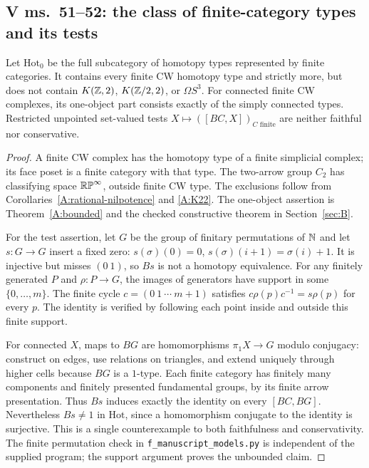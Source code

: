 \subsection{V ms.~51--52: the class of finite-category types and its tests}
\begin{proposition}\label{F:Hot0}
Let $\mathrm{Hot}_0$ be the full subcategory of homotopy types represented
by finite categories. It contains every finite CW homotopy type and
strictly more, but does not contain $K(\mathbb Z,2)$, $K(\mathbb Z/2,2)$, or $\Omega S^3$.
For connected finite CW complexes, its one-object part consists exactly
of the simply connected types. Restricted unpointed set-valued tests
$X\mapsto([BC,X])_{C\text{ finite}}$ are neither faithful nor conservative.
\end{proposition}
\begin{proof}
A finite CW complex has the homotopy type of a finite simplicial complex;
its face poset is a finite category with that type. The two-arrow group
$C_2$ has classifying space $\mathbb {RP}^\infty$, outside finite CW type. The
exclusions follow from Corollaries~\ref{A:rational-nilpotence} and
\ref{A:K22}. The one-object assertion is Theorem~\ref{A:bounded} and the
checked constructive theorem in Section~\ref{sec:B}.

For the test assertion, let $G$ be the group of finitary permutations of
$\mathbb N$ and let $s:G\to G$ insert a fixed zero:
$s(\sigma)(0)=0$, $s(\sigma)(i+1)=\sigma(i)+1$. It is injective but misses
$(0\ 1)$, so $Bs$ is not a homotopy equivalence. For any finitely generated
$P$ and $\rho:P\to G$, the images of generators have support in some
$\{0,\ldots,m\}$. The finite cycle $c=(0\ 1\ \cdots\ m+1)$ satisfies
$c\rho(p)c^{-1}=s\rho(p)$ for every $p$. The identity is verified by
following each point inside and outside this finite support.

For connected $X$, maps to $BG$ are homomorphisms $\pi_1X\to G$ modulo
conjugacy: construct on edges, use relations on triangles, and extend
uniquely through higher cells because $BG$ is a $1$-type. Each finite
category has finitely many components and finitely presented fundamental
groups, by its finite arrow presentation. Thus $Bs$ induces exactly the
identity on every $[BC,BG]$. Nevertheless $Bs\ne1$ in $\mathrm{Hot}$,
since a homomorphism conjugate to the identity is surjective. This is a
single counterexample to both faithfulness and conservativity. The
finite permutation check in \texttt{f\_manuscript\_models.py} is independent
of the supplied program; the support argument proves the unbounded claim.
\end{proof}


